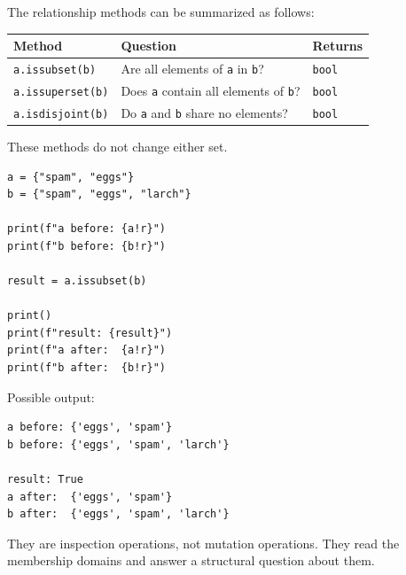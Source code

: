 The relationship methods can be summarized as follows:

\begin{center}
\begin{tabular}{lll}
\textbf{Method} & \textbf{Question} & \textbf{Returns} \\
\hline
\texttt{a.issubset(b)} & Are all elements of \texttt{a} in \texttt{b}? & \texttt{bool} \\
\texttt{a.issuperset(b)} & Does \texttt{a} contain all elements of \texttt{b}? & \texttt{bool} \\
\texttt{a.isdisjoint(b)} & Do \texttt{a} and \texttt{b} share no elements? & \texttt{bool} \\
\end{tabular}
\end{center}

These methods do not change either set.

\begin{verbatim}
a = {"spam", "eggs"}
b = {"spam", "eggs", "larch"}

print(f"a before: {a!r}")
print(f"b before: {b!r}")

result = a.issubset(b)

print()
print(f"result: {result}")
print(f"a after:  {a!r}")
print(f"b after:  {b!r}")
\end{verbatim}

Possible output:

\begin{verbatim}
a before: {'eggs', 'spam'}
b before: {'eggs', 'spam', 'larch'}

result: True
a after:  {'eggs', 'spam'}
b after:  {'eggs', 'spam', 'larch'}
\end{verbatim}

They are inspection operations, not mutation operations. They read the membership domains and answer a structural question about them.